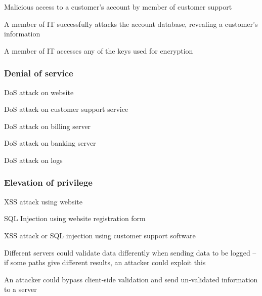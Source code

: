 \begin{numbered}[resume]
    \item \label{disclosureCustomerSupport} Malicious access to a customer's account by member of customer support
    
    \item \label{disclosureItDetails} A member of IT successfully attacks the account database, revealing a customer's information

    \item \label{disclosureItKeys} A member of IT accesses any of the keys used for encryption
\end{numbered}

\subsubsection{Denial of service}

\begin{numbered}[resume]
    \item \label{dosWebsite} DoS attack on website
    \item \label{dosCustomerSupport} DoS attack on customer support service
    \item \label{dosBillingServer} DoS attack on billing server
    \item \label{dosBankingServer} DoS attack on banking server
    \item \label{dosLogs} DoS attack on logs
\end{numbered}

\subsubsection{Elevation of privilege}

\begin{numbered}[resume]
    \item \label{eopXss} XSS attack using website
    \item \label{eopSqlInjection} SQL Injection using website registration form
    \item \label{eopCustomerSupport} XSS attack or SQL injection using customer support software
    \item \label{eopValidationDifference} Different servers could validate data differently when sending data to be logged – if some paths give different results, an attacker could exploit this
    \item \label{eopClientSideValidation} An attacker could bypass client-side validation and send un-validated information to a server
\end{numbered}

